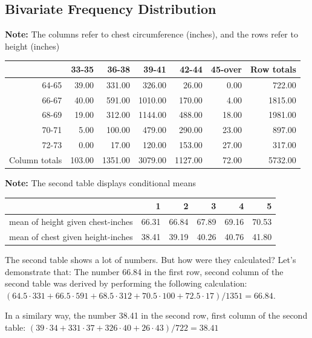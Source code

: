 \documentclass{article} %
\begin{document}
\subsection{Bivariate Frequency Distribution}
\begin{table}[H]
\centering
\textbf{Note:} The columns refer to chest circumference (inches), and the rows refer to height (inches)
\begin{tabular}{rrrrrrr}
  \hline
 & 33-35 & 36-38 & 39-41 & 42-44 & 45-over & Row totals \\ 
  \hline
64-65 & 39.00 & 331.00 & 326.00 & 26.00 & 0.00 & 722.00 \\ 
  66-67 & 40.00 & 591.00 & 1010.00 & 170.00 & 4.00 & 1815.00 \\ 
  68-69 & 19.00 & 312.00 & 1144.00 & 488.00 & 18.00 & 1981.00 \\ 
  70-71 & 5.00 & 100.00 & 479.00 & 290.00 & 23.00 & 897.00 \\ 
  72-73 & 0.00 & 17.00 & 120.00 & 153.00 & 27.00 & 317.00 \\ 
  Column totals & 103.00 & 1351.00 & 3079.00 & 1127.00 & 72.00 & 5732.00 \\ 
   \hline
\end{tabular}
\end{table}
\begin{table}[H]
\centering
\textbf{Note:} The second table displays conditional means
\begin{tabular}{rrrrrr}
  \hline
 & 1 & 2 & 3 & 4 & 5 \\ 
  \hline
mean of height given chest-inches  & 66.31 & 66.84 & 67.89 & 69.16 & 70.53 \\ 
  mean of chest given height-inches & 38.41 & 39.19 & 40.26 & 40.76 & 41.80 \\ 
   \hline
\end{tabular}
\end{table}
The second table shows a lot of numbers. But how were they calculated?
Let's demonstrate that:
The number 66.84 in the first row, second column of the second table was derived by performing the following calculation:
\begin{math}(64.5\cdot331+66.5\cdot591+68.5\cdot312+70.5\cdot100+72.5\cdot17)/1351=66.84\end{math}.

In a similary way, the number 38.41 in the second row, first column of the second table:
\begin{math}(39\cdot34+331\cdot37+326\cdot40+26\cdot43)/722 = 38.41\end{math}
\end{document}
